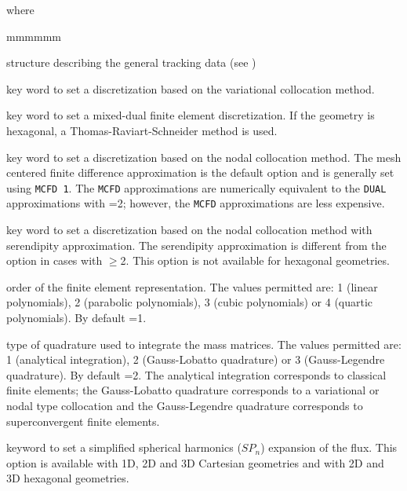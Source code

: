 \noindent where
\begin{ListeDeDescription}{mmmmmm}

\item[\dstr{desctrack}] structure describing the general tracking data (see
)

\item[\moc{PRIM}] key word to set a discretization based on the variational collocation method.

\item[\moc{DUAL}] key word to set a mixed-dual finite element discretization. If the
geometry is hexagonal, a Thomas-Raviart-Schneider method is used.

\item[\moc{MCFD}] key word to set a discretization based  on the nodal
collocation method. The mesh centered finite difference approximation is the
default option and is generally set using {\tt MCFD~1}. The {\tt MCFD}
approximations are numerically equivalent to the {\tt DUAL} approximations
with =2; however, the {\tt MCFD} approximations are less
expensive. 

\item[\moc{LUMP}] key word to set a discretization  based on the nodal
collocation method with serendipity approximation. The serendipity
approximation is different from the  option in cases with $\ge$2. This option is not available for hexagonal geometries.

\item[\dusa{ielem}] order of the finite element representation.  The values
permitted are: 1 (linear polynomials), 2 (parabolic polynomials), 3 (cubic
polynomials) or 4 (quartic polynomials). By default =1.

\item[\dusa{icol}] type of quadrature used to  integrate the mass matrices.
The values permitted are: 1 (analytical integration), 2  (Gauss-Lobatto
quadrature) or 3 (Gauss-Legendre quadrature). By default =2. The
analytical integration corresponds to classical finite elements; the
Gauss-Lobatto quadrature corresponds to a variational or nodal type
collocation and the Gauss-Legendre quadrature corresponds to superconvergent
finite elements.

\item[\moc{SPN}] keyword to set a simplified spherical harmonics ($SP_n$) expansion
of the flux.\cite{nse2005,ane10a} This option is available with 1D, 2D and 3D Cartesian geometries and with 2D and 3D
hexagonal geometries.


\end{ListeDeDescription}
